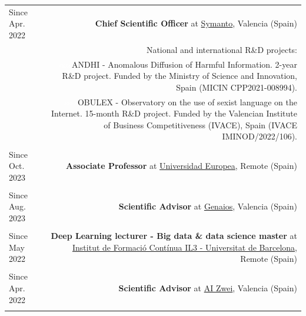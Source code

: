\documentclass[10pt]{article}
\begin{document}
\begin{tabular}{L!{\VRule}R}

Since Apr.~ 2022 &{\textbf{Chief Scientific Officer} at \href{https://www.symanto.com/}{Symanto}, Valencia (Spain)}\\
&\scriptsize{National and international R\&D projects:}\\
&\scriptsize{\textcolor{white}{ssss}ANDHI - Anomalous Diffusion of Harmful Information. 2-year R\&D project. Funded by the Ministry of Science and Innovation, Spain (MICIN CPP2021-008994).}\\
&\scriptsize{\textcolor{white}{ssss}OBULEX - Observatory on the use of sexist language on the Internet. 15-month R\&D project. Funded by the Valencian Institute of Business Competitiveness (IVACE), Spain (IVACE IMINOD/2022/106)}. \\
&\\

Since Oct.~ 2023 &{\textbf{Associate Professor} at \href{https://universidadeuropea.com/}{Universidad Europea}, Remote (Spain)}\\
&\\

Since Aug.~ 2023 &{\textbf{Scientific Advisor} at \href{https://genaios.ai/}{Genaios}, Valencia (Spain)}\\
&\\

Since May 2022 &{\textbf{Deep Learning lecturer - Big data \& data science master} at  \href{https://www.il3.ub.edu/}{Institut de Formació Contínua IL3 - Universitat de Barcelona}, Remote (Spain)}\\
&\\

Since Apr.~ 2022 &{\textbf{Scientific Advisor} at \href{https://www.aizwei.com/}{AI Zwei}, Valencia (Spain)}\\
&\\

\end{tabular}
\end{document}
